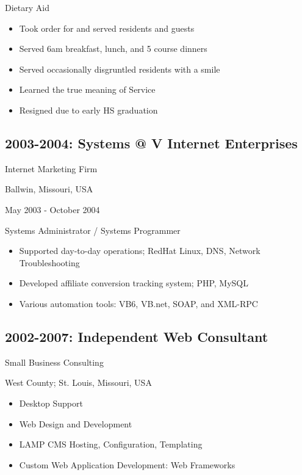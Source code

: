 \documentclass[letter,,openany,oneside]{sphinxhowto}
\begin{document}
Dietary Aid
\begin{itemize}
\item {} 
Took order for and served residents and guests

\item {} 
Served 6am breakfast, lunch, and 5 course dinners

\item {} 
Served occasionally disgruntled residents with a smile

\item {} 
Learned the true meaning of Service

\item {} 
Resigned due to early HS graduation

\end{itemize}


\subsection{2003-2004: Systems @ V Internet Enterprises}
\label{resume:systems-v-internet-enterprises}
\begin{DUlineblock}{0em}
\item[] Internet Marketing Firm
\item[] Ballwin, Missouri, USA
\item[] May 2003 - October 2004
\end{DUlineblock}

Systems Administrator / Systems Programmer
\begin{itemize}
\item {} 
Supported day-to-day operations; RedHat Linux, DNS, Network Troubleshooting

\item {} 
Developed affiliate conversion tracking system; PHP, MySQL

\item {} 
Various automation tools: VB6, VB.net, SOAP, and XML-RPC

\end{itemize}


\subsection{2002-2007: Independent Web Consultant}
\label{resume:independent-web-consultant}
\begin{DUlineblock}{0em}
\item[] Small Business Consulting
\item[] West County; St. Louis, Missouri, USA
\end{DUlineblock}
\begin{itemize}
\item {} 
Desktop Support

\item {} 
Web Design and Development

\item {} 
LAMP CMS Hosting, Configuration, Templating

\item {} 
Custom Web Application Development: Web Frameworks

\end{itemize}
\end{document}
